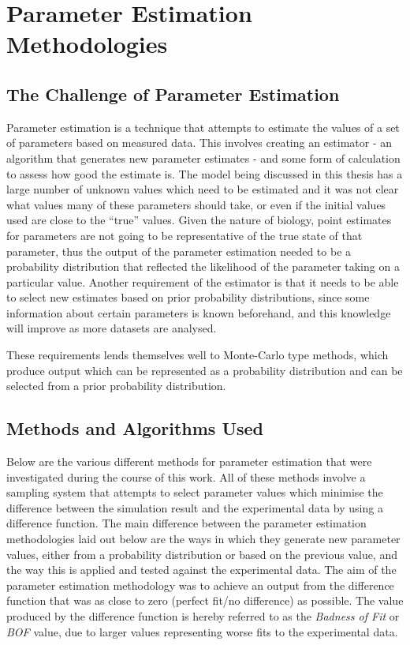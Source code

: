 \chapter{Parameter Estimation Methodologies}
\label{chap:paramest}

\section{The Challenge of Parameter Estimation}
Parameter estimation is a technique that attempts to estimate the values of a set of parameters based on measured data. This involves creating an estimator - an algorithm that generates new parameter estimates - and some form of calculation to assess how good the estimate is. The model being discussed in this thesis has a large number of unknown values which need to be estimated and it was not clear what values many of these parameters should take, or even if the initial values used are close to the ``true'' values. Given the nature of biology, point estimates for parameters are not going to be representative of the true state of that parameter, thus the output of the parameter estimation needed to be a probability distribution that reflected the likelihood of the parameter taking on a particular value. Another requirement of the estimator is that it needs to be able to select new estimates based on prior probability distributions, since some information about certain parameters is known beforehand, and this knowledge will improve as more datasets are analysed.

These requirements lends themselves well to Monte-Carlo type methods, which produce output which can be represented as a probability distribution and can be selected from a prior probability distribution.

\section{Methods and Algorithms Used}
Below are the various different methods for parameter estimation that were investigated during the course of this work. All of these methods involve a sampling system that attempts to select parameter values which minimise the difference between the simulation result and the experimental data by using a difference function. The main difference between the parameter estimation methodologies laid out below are the ways in which they generate new parameter values, either from a probability distribution or based on the previous value, and the way this is applied and tested against the experimental data. The aim of the parameter estimation methodology was to achieve an output from the difference function that was as close to zero (perfect fit/no difference) as possible. The value produced by the difference function is hereby referred to as the \textit{Badness of Fit} or \textit{BOF} value, due to larger values representing worse fits to the experimental data.

